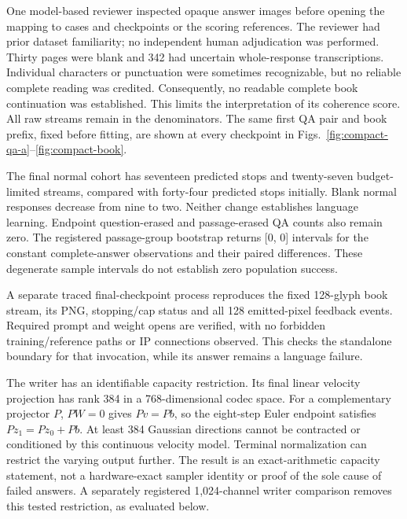 \documentclass[12pt,a4paper]{article}
\begin{document}
One model-based reviewer inspected opaque answer images before opening the
mapping to cases and checkpoints or the scoring references. The reviewer had prior dataset
familiarity; no independent human adjudication was performed. Thirty pages
were blank and 342 had uncertain whole-response transcriptions. Individual
characters or punctuation were sometimes recognizable, but no reliable
complete reading was credited. Consequently, no readable complete book
continuation was established. This limits the interpretation of its coherence
score. All raw streams remain in the denominators. The same first QA pair and
book prefix, fixed before fitting, are shown at every checkpoint in
Figs.~\ref{fig:compact-qa-a}--\ref{fig:compact-book}.

The final normal cohort has seventeen predicted stops and twenty-seven
budget-limited streams, compared with forty-four predicted stops initially.
Blank normal responses decrease from nine to two. Neither change establishes
language learning. Endpoint question-erased and passage-erased QA counts also
remain zero. The registered passage-group bootstrap returns [0, 0] intervals
for the constant complete-answer observations and their paired differences.
These degenerate sample intervals do not establish zero population success.

A separate traced final-checkpoint process reproduces the fixed 128-glyph
book stream, its PNG, stopping/cap status and all 128 emitted-pixel feedback
events. Required prompt and weight opens are verified, with no forbidden
training/reference paths or IP connections observed. This checks the standalone
boundary for that invocation, while its answer remains a language failure.

The writer has an identifiable capacity restriction. Its final linear
velocity projection has rank 384 in a 768-dimensional codec space. For a
complementary projector $P$, $PW=0$ gives $Pv=Pb$, so the eight-step Euler
endpoint satisfies $Pz_1=Pz_0+Pb$. At least 384 Gaussian directions cannot be
contracted or conditioned by this continuous velocity model. Terminal
normalization can restrict the varying output further. The result is an
exact-arithmetic capacity statement, not a hardware-exact sampler identity or
proof of the sole cause of failed answers. A separately registered 1,024-channel
writer comparison removes this tested restriction, as evaluated below.

\end{document}
